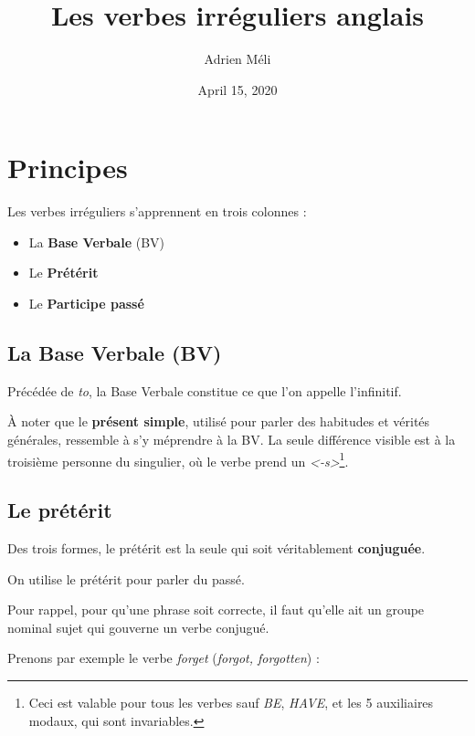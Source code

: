 \documentclass[
]{article}
\title{Les verbes irréguliers anglais}
\author{Adrien Méli}
\date{April 15, 2020}
\begin{document}
\maketitle

{
\setcounter{tocdepth}{1}
\tableofcontents
}
\hypertarget{principes}{%
\section{Principes}\label{principes}}

Les verbes irréguliers s'apprennent en trois colonnes :

\begin{itemize}
\item
  La \textbf{Base Verbale} (BV)
\item
  Le \textbf{Prétérit}
\item
  Le \textbf{Participe passé}
\end{itemize}

\hypertarget{la-base-verbale-bv}{%
\subsection{La Base Verbale (BV)}\label{la-base-verbale-bv}}

Précédée de \emph{to}, la Base Verbale constitue ce que l'on appelle l'infinitif.

À noter que le \textbf{présent simple}, utilisé pour parler des habitudes et vérités générales, ressemble à s'y méprendre à la BV.
La seule différence visible est à la troisième personne du singulier, où le verbe prend un \emph{\textless-s\textgreater{}}\footnote{Ceci est valable pour tous les verbes sauf \emph{BE}, \emph{HAVE}, et les 5 auxiliaires modaux, qui sont invariables.}.

\hypertarget{le-pruxe9tuxe9rit}{%
\subsection{Le prétérit}\label{le-pruxe9tuxe9rit}}

Des trois formes, le prétérit est la seule qui soit véritablement \textbf{conjuguée}.

On utilise le prétérit pour parler du passé.

Pour rappel, pour qu'une phrase soit correcte, il faut qu'elle ait un groupe nominal sujet qui gouverne un verbe conjugué.

Prenons par exemple le verbe \emph{forget} (\emph{forgot, forgotten}) :
\end{document}
